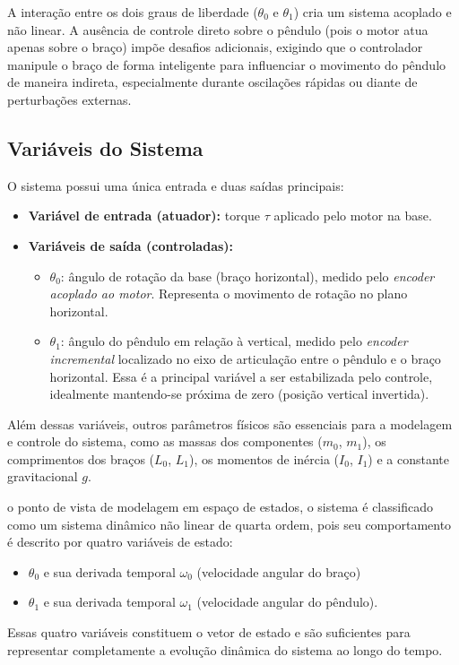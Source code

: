 \documentclass[9pt,a4paper,twocolumn,twoside]{tau-class/tau}
\begin{document}
    A interação entre os dois graus de liberdade ($\theta_0$ e $\theta_1$) cria um sistema acoplado e não linear. A ausência de controle direto sobre o pêndulo (pois o motor atua apenas sobre o braço) impõe desafios adicionais, exigindo que o controlador manipule o braço de forma inteligente para influenciar o movimento do pêndulo de maneira indireta, especialmente durante oscilações rápidas ou diante de perturbações externas.

    \subsection{Variáveis do Sistema}
    
    O sistema possui uma única entrada e duas saídas principais:
    
    \begin{itemize}
        \item \textbf{Variável de entrada (atuador):} torque $\tau$ aplicado pelo motor na base.
        \item \textbf{Variáveis de saída (controladas):}
        \begin{itemize}
        \item $\theta_0$: ângulo de rotação da base (braço horizontal), medido pelo \textit{encoder acoplado ao motor}. Representa o movimento de rotação no plano horizontal.
        \item $\theta_1$: ângulo do pêndulo em relação à vertical, medido pelo \textit{encoder incremental} localizado no eixo de articulação entre o pêndulo e o braço horizontal. Essa é a principal variável a ser estabilizada pelo controle, idealmente mantendo-se próxima de zero (posição vertical invertida).
        \end{itemize}
    \end{itemize}

    Além dessas variáveis, outros parâmetros físicos são essenciais para a modelagem e controle do sistema, como as massas dos componentes ($m_0$, $m_1$), os comprimentos dos braços ($L_0$, $L_1$), os momentos de inércia ($I_0$, $I_1$) e a constante gravitacional $g$.

    o ponto de vista de modelagem em espaço de estados, o sistema é classificado como um sistema dinâmico não linear de quarta ordem, pois seu comportamento é descrito por quatro variáveis de estado:
    \begin{itemize}
    
    \item $\theta_0$ e sua derivada temporal $\omega_0$ (velocidade angular do braço)

    \item $\theta_1$ e sua derivada temporal $\omega_1$ (velocidade angular do pêndulo).
    
    \end{itemize}
    Essas quatro variáveis constituem o vetor de estado e são suficientes para representar completamente a evolução dinâmica do sistema ao longo do tempo.
\end{document}

